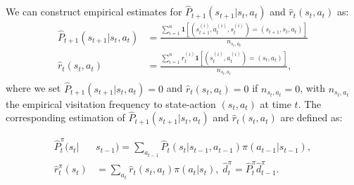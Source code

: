We can construct empirical estimates for $\widehat{P}_{t+1}(s_{t+1}|s_{t},a_{t})$ and $\widehat{r}_t(s_t,a_t)$ as: 
{\small
\begin{equation}\label{eq:tabular_MIS_construction}
\begin{aligned}
\widehat{P}_{t+1}(s_{t+1}|s_{t},a_{t})&=\frac{\sum_{i=1}^n\mathbf{1}[(s^{(i)}_{t+1},a^{(i)}_t,s^{(i)}_t)=(s_{t+1},s_{t},a_{t})]}{n_{s_{t},a_{t}}}\\
\widehat{r}_t(s_t,a_t)&=\frac{\sum_{i=1}^n r_t^{(i)}\mathbf{1}[(s^{(i)}_t,a^{(i)}_t)=(s_t,a_t)]}{n_{s_t,a_t}},\\
\end{aligned}
\end{equation}
}
where we set $\widehat{P}_{t+1}(s_{t+1}|s_{t},a_{t})=0$ and $\widehat{r}_t(s_t,a_t)=0$ if $n_{s_t,a_t}=0$, with $n_{s_t,a_t}$ the empirical visitation frequency to state-action $(s_t,a_t)$ at time $t$. The corresponding estimation of $\widehat{P}_{t+1}(s_{t+1}|s_{t},a_{t})$ and $\widehat{r}_t(s_t,a_t)$ are defined as:

\begin{equation}\label{eq:tabular_MIS_construction2}
\begin{aligned}
\widehat{P}^\pi_t(s_t|&s_{t-1})=\sum_{a_{t-1}}\widehat{P}_t(s_t|s_{t-1},a_{t-1})\pi(a_{t-1}|s_{t-1}),\\
\widehat{r}^\pi_t(s_t)&=\sum_{a_t}\widehat{r}_t(s_t,a_t)\pi(a_t|s_t),\;\widehat{d}^\pi_t=\widehat{P}^\pi_t\widehat{d}^\pi_{t-1}. 
\end{aligned}
\end{equation}





